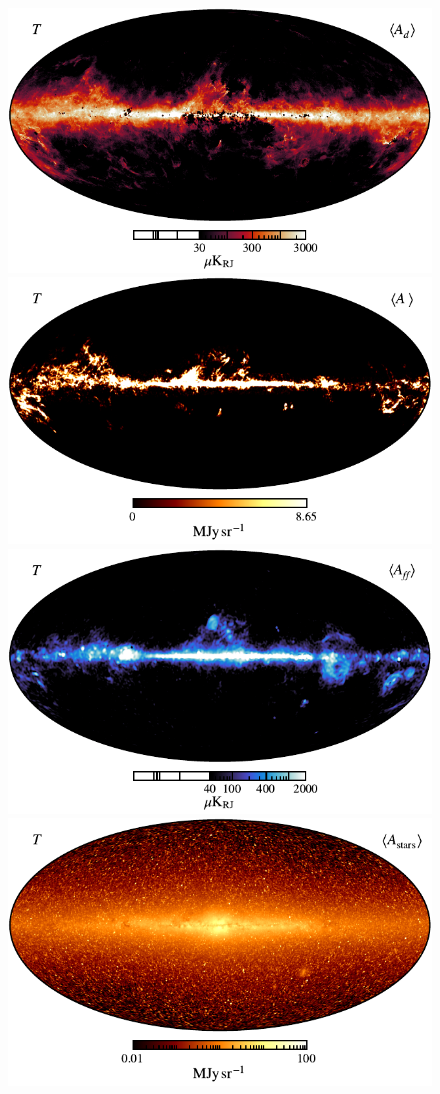 \documentclass{aa}
\begin{document}
\begin{figure}
	\centering
	\includegraphics[width=0.49\linewidth]{figs/CG_dust_v05_I_MEAN_w12_n2048_cb_c-sunburst.pdf}
        \includegraphics[width=0.49\linewidth]{figs/CG_CO_tot_v05_I_MEAN_w12_n1024_cb_c-afmhot.pdf}\\
        \includegraphics[width=0.49\linewidth]{figs/CG_freefree_v05_I_MEAN_w12_n1024_cb_c-freeze.pdf}
        \includegraphics[width=0.49\linewidth]{figs/CG_stars_n0512_v06_I_MEAN_w12_n512_cb_c-afmhot.pdf}\\
	\caption{}
	\label{fig:fg_amp}
\end{figure}
\end{document}
